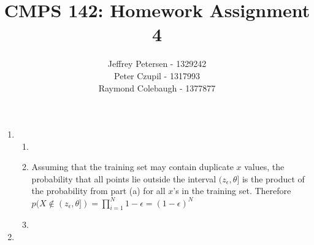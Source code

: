 \documentclass{article}
\title{CMPS 142: Homework Assignment 4}
\author{Jeffrey Petersen - 1329242\\Peter Czupil - 1317993\\Raymond Colebaugh - 1377877}
\begin{document}
\maketitle
\begin{enumerate}
        \item 
            \begin{enumerate}
                \item
                    \noindent{The probability that a point randomly drawn from $p$ is located somewhere in the interval $(z_{\epsilon}, \theta)$ is equal to $\epsilon$. Thus the probability that a point falls outside this interval is the complement of the previous probability. Therefore, $p((0, z_{\epsilon}]) = 1 - \epsilon$. }
                \item
                    Assuming that the training set may contain duplicate $x$ values, the probability that all points lie outside the interval $(z_{\epsilon}, \theta]$ is the product of the probability from part (a) for all $x$'s in the training set. Therefore $p(X \notin (z_{\epsilon}, \theta]) = \prod_{i = 1}^{N} 1 - \epsilon = (1 - \epsilon)^N$ 
                \item
            \end{enumerate}
        \item 
\end{enumerate}
\end{document}

